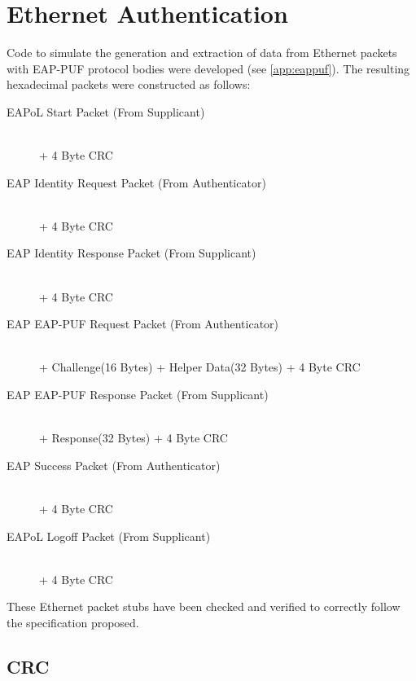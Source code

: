 \section{Ethernet Authentication}

Code to simulate the generation and extraction of data from Ethernet packets
with EAP-PUF protocol bodies were developed (see \autoref{app:eappuf}). The
resulting hexadecimal packets were constructed as follows:

\begin{description}
\item[EAPoL Start Packet (From Supplicant)] \hfill \\
 + 4 Byte CRC
\item[EAP Identity Request Packet (From Authenticator)] \hfill \\
 + 4 Byte CRC
\item[EAP Identity Response Packet (From Supplicant)] \hfill \\
 + 4 Byte CRC
\item[EAP EAP-PUF Request Packet (From Authenticator)] \hfill \\
 + Challenge(16 Bytes)
                                               + Helper Data(32 Bytes)
                                               + 4 Byte CRC
\item[EAP EAP-PUF Response Packet (From Supplicant)] \hfill \\
 + Response(32 Bytes)
                                               + 4 Byte CRC
\item[EAP Success Packet (From Authenticator)] \hfill \\
 + 4 Byte CRC
\item[EAPoL Logoff Packet (From Supplicant)] \hfill \\
 + 4 Byte CRC
\end{description}

These Ethernet packet stubs have been checked and verified to correctly follow
the specification proposed.

\subsection{CRC}

